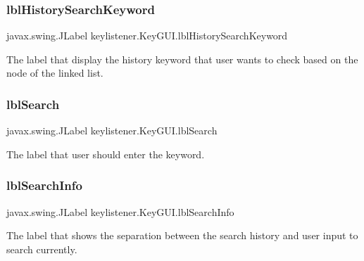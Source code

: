 \subsubsection{\texorpdfstring{lbl\+History\+Search\+Keyword}{lblHistorySearchKeyword}}
{\footnotesize\ttfamily javax.\+swing.\+J\+Label keylistener.\+Key\+G\+U\+I.\+lbl\+History\+Search\+Keyword\hspace{0.3cm}{\ttfamily [private]}}

The label that display the history keyword that user wants to check based on the node of the linked list. \mbox{\label{classkeylistener_1_1_key_g_u_i_a651562b55ac5b267be118fa85ee83b5d}} 
\subsubsection{\texorpdfstring{lbl\+Search}{lblSearch}}
{\footnotesize\ttfamily javax.\+swing.\+J\+Label keylistener.\+Key\+G\+U\+I.\+lbl\+Search\hspace{0.3cm}{\ttfamily [private]}}

The label that user should enter the keyword. \mbox{\label{classkeylistener_1_1_key_g_u_i_aa1b6d17eb8dab8ab033595be8cc66b81}} 
\subsubsection{\texorpdfstring{lbl\+Search\+Info}{lblSearchInfo}}
{\footnotesize\ttfamily javax.\+swing.\+J\+Label keylistener.\+Key\+G\+U\+I.\+lbl\+Search\+Info\hspace{0.3cm}{\ttfamily [private]}}

The label that shows the separation between the search history and user input to search currently. \mbox{\label{classkeylistener_1_1_key_g_u_i_a53c4619456ef147805fdbd0f33527fa7}} 
